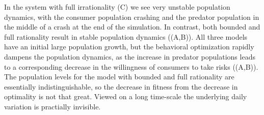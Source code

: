 In the system with full irrationality (C) we see very unstable population dynamics, with the consumer population crashing and the predator population in the middle of a crash at the end of the simulation. In contrast, both bounded and full rationality result in stable population dynamics ((A,B)). All three models have an initial large population growth, but the behavioral optimization rapidly dampens the population dynamics, as the increase in predator populations leads to a corresponding decrease in the willingness of consumers to take risks ((A,B)). The population levels for the model with bounded and full rationality are essentially indistinguishable, so the decrease in fitness from the decrease in optimality is not that great. Viewed on a long time-scale the underlying daily variation is practially invisible.

